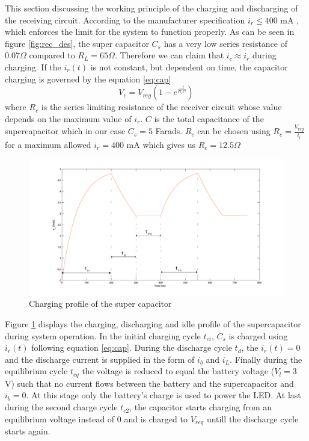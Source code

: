 This section discussing the working principle of the charging and discharging of the receiving circuit. According to the manufacturer specification $i_r \leq 400 $ mA , which enforces the limit for the system to function properly.
As can be seen in figure \ref{fig:rec_des}, the super capacitor $C_s$ has a very low series resistance of $0.07 \Omega$ compared to $R_L = 65 \Omega$. Therefore we can claim that $i_c \approx i_r$ during charging. If the $i_r(t)$ is not constant, but dependent on time, the capacitor charging is governed by the equation \ref{eq:cap}
\begin{equation}\label{eq:cap}
 V_c = V_{reg} \left(1 - e^{\frac{-t}{R_cC}}\right)
\end{equation}
where $R_c$ is the series limiting resistance of the receiver circuit whose value depends on the maximum value of $i_r$. $C$ is the total capacitance of the supercapacitor which in our case $C_s = 5 $ Farads. $R_c$ can be chosen using $R_c = \frac { V_{reg}}{i_r} $ for a maximum allowed $i_r = 400$ mA which gives us $R_c = 12.5 \Omega$

\begin{figure}[h!]
\centering
\includegraphics[width=1\textwidth]{cd_cycle.pdf}
\caption{Charging profile of the super capacitor }
\label{fig:ch_profile}
\end{figure}

Figure \ref{fig:ch_profile} displays the charging, discharging and idle profile of the supercapacitor during system operation. In the initial charging cycle $t_{ci}$, $C_s$ is charged using $i_r(t)$ following equation \ref{eq:cap}. During the discharge cycle $t_d$, the $i_r(t) = 0$ and the discharge current is supplied in the form of $i_b$ and $i_L$. Finally during the equilibrium cycle $t_{eq}$ the voltage is reduced to equal the battery voltage ($V_l = 3$ V) such that no current flows between the battery and the supercapacitor and $i_b = 0$. At this stage only the battery's charge is used to power the LED. At last during the second charge cycle $t_{c2}$, the capacitor starts charging from an equilibrium voltage instead of 0 and is charged to $V_{reg}$ untill the discharge cycle starts again.
